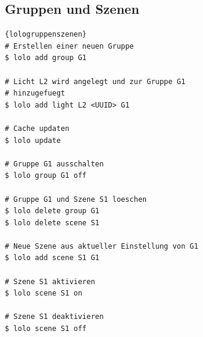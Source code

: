\documentclass[a4paper,12pt]{article}
\begin{document}
\newpage

\subsection{Gruppen und Szenen}

\begin{lstlisting}[caption=Bedienung von Gruppen und Szenen,
                   basicstyle=\footnotesize\ttfamily]{lologruppenszenen}
# Erstellen einer neuen Gruppe
$ lolo add group G1

# Licht L2 wird angelegt und zur Gruppe G1
# hinzugefuegt
$ lolo add light L2 <UUID> G1

# Cache updaten
$ lolo update

# Gruppe G1 ausschalten
$ lolo group G1 off

# Gruppe G1 und Szene S1 loeschen
$ lolo delete group G1
$ lolo delete scene S1

# Neue Szene aus aktueller Einstellung von G1
$ lolo add scene S1 G1

# Szene S1 aktivieren
$ lolo scene S1 on

# Szene S1 deaktivieren
$ lolo scene S1 off

\end{lstlisting}

\newpage

\printglossary[type=\acronymtype,title=Abkürzungsverzeichnis]

\newpage

\printglossary
\end{document}
